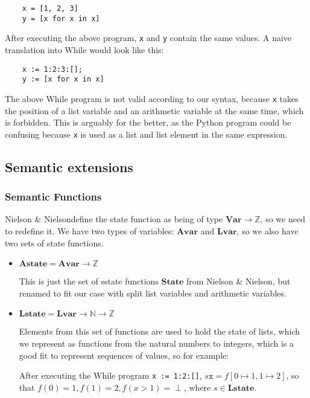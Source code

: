 \documentclass[12pt]{article}
\newcommand\mono\texttt
\newcommand{\Ntwo}{Nielson \& Nielson}
\newcommand{\Var}{\mathbf{Var}}
\newcommand{\Avar}{\mathbf{Avar}}
\newcommand{\Lvar}{\mathbf{Lvar}}
\newcommand{\State}{\mathbf{State}}
\newcommand{\Astate}{\mathbf{Astate}}
\newcommand{\Lstate}{\mathbf{Lstate}}
\begin{document}
\begin{lstlisting}
    x = [1, 2, 3]
    y = [x for x in x]
\end{lstlisting}

After executing the above program, \mono{x} and \mono{y} contain the same values. A naive translation into While would look like this:

\begin{lstlisting}
    x := 1:2:3:[];
    y := [x for x in x]
\end{lstlisting}

The above While program is not valid according to our syntax, because \mono{x} takes the position of a list variable and an arithmetic variable at the same time, which is forbidden. This is arguably for the better, as the Python program could be confusing because \mono{x} is used as a list and list element in the same expression.

\subsection{Semantic extensions}

\subsubsection{Semantic Functions}

\Ntwo define the state function as being of type $\Var \rightarrow \mathbb{Z}$, so we need to redefine it. We have two types of variables: $\Avar$ and $\Lvar$, so we also have two sets of state functions.

\begin{itemize}
    \item $\Astate = \Avar \rightarrow \mathbb{Z}$

    This is just the set of sstate functions $\State$ from \Ntwo \cite{wiley}, but renamed to fit our case with split list variables and arithmetic variables.
    \item $\Lstate = \Lvar \rightarrow \mathbb{N} \rightarrow \mathbb{Z}$

    Elements from this set of functions are used to hold the state of lists, which we represent as functions from the natural numbers to integers, which is a good fit to represent sequences of values, so for example:

    After executing the While program \mono{x := 1:2:[]}, $s \mono{x} = f[0 \mapsto 1, 1 \mapsto 2]$, so that $f(0) = 1, f(1) = 2, f(x > 1) = \perp$, where $s \in \Lstate$.
\end{itemize}
\end{document}

